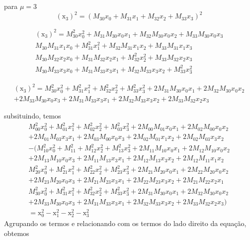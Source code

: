 \documentclass[10pt,a4paper]{article}
\begin{document}
\begin{enumerate}
	para $ \mu =3 $
	$$ (\text{\~{x}}_3)^2 =( M_{30} x_0 + M_{31} x_1+M_{32} x_2+M_{33} x_3)^2 $$
	
	\begin{equation}\nonumber
		\begin{split}
			(\text{\~{x}}_3)^2 =M_{30}^2 x_0^2 + M_{31}M_{30} x_0 x_1+M_{32} M_{30} x_0x_2+M_{33}M_{30} x_0 x_3\\
			M_{30}M_{31} x_1 x_0 + M_{31}^2 x_1^2+M_{32}M_{31} x_1 x_2+M_{33}M_{31} x_1 x_3\\
			M_{30}M_{32} x_2 x_0 + M_{31} M_{32} x_2x_1+M_{32}^2 x_2^2+M_{33}M_{32} x_2 x_3\\
			 M_{30}M_{33} x_3 x_0 + M_{31} M_{33} x_3x_1+M_{32}M_{33} x_3 x_2+M_{33}^2 x_3^2
		\end{split}
	\end{equation}

		\begin{equation}\nonumber
		\begin{split}
			(\text{\~{x}}_3)^2 =M_{30}^2 x_0^2 + M_{31}^2 x_1^2+M_{32}^2 x_2^2+M_{33}^2 x_3^2+2M_{31}M_{30} x_0 x_1+2M_{32} M_{30} x_0x_2\\+2M_{33}M_{30} x_0 x_3+2 M_{31} M_{33} x_3x_1+2M_{32}M_{33} x_3 x_2+2M_{33}M_{32} x_2 x_3
		\end{split}
	\end{equation}
	
	subsituindo, temos
	\begin{equation}\nonumber
		\begin{split}
			M_{00}^2 x_0^2 +M_{01}^2 x_1^2+M_{02}^2x_2^2+M_{03}^2 x_3^2+ 2M_{00}M_{01} x_0x_1+2M_{02}M_{00} x_0 x_2\\+2M_{01}M_{03} x_3 x_1+2M_{03}M_{00} x_0 x_3+2M_{02}M_{01} x_1 x_2+2M_{02}M_{03} x_3 x_2 \\
			-(M_{10}^2 x_0^2 + M_{11}^2+M_{12}^2 x_2^2+M_{13}^2 x_3^2+2M_{11}M_{10} x_0 x_1+2M_{12} M_{10} x_0x_2\\+2M_{13}M_{10} x_0 x_3+2M_{11}M_{13} x_3 x_1+2M_{12} M_{13} x_3x_2+2M_{12}M_{11} x_1 x_2\\
			M_{20}^2 x_0^2 + M_{21}^2 x_1^2+M_{22}^2 x_2^2+M_{23}^2 x_3^2	+2 M_{21}M_{20} x_0 x_1+2M_{22} M_{20}
			x_0x_2\\+2M_{23} M_{20} x_0x_3+2M_{21} M_{23} x_3x_1+2M_{22}M_{23} x_3 x_2+2 M_{21} M_{22} x_2x_1\\
			M_{30}^2 x_0^2 + M_{31}^2 x_1^2+M_{32}^2 x_2^2+M_{33}^2 x_3^2+2M_{31}M_{30} x_0 x_1+2M_{32} M_{30} x_0x_2\\+2M_{33}M_{30} x_0 x_3+2 M_{31} M_{33} x_3x_1+2M_{32}M_{33} x_3 x_2+2M_{33}M_{32} x_2 x_3) \\
			= \text{x}^2_0 -  \text{x}^2_1 -  \text{x}^2_2 -  \text{x}^2_3
		\end{split}
	\end{equation}
	Agrupando os termos e relacionando com os termos do lado direito da equação, obtemos
	

\end{enumerate}
\end{document}
